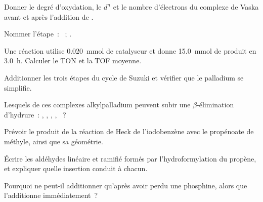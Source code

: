 \begin{exercise}[$\star$]\label{exo:b2:catalytic-cycles:1}
Donner le degré d'oxydation, le $d^n$ et le nombre d'électrons du complexe de Vaska
 avant et après l'addition de .
\end{exercise}

\begin{exercise}[$\star$]\label{exo:b2:catalytic-cycles:2}
Nommer l'étape~: ~; .
\end{exercise}

\begin{exercise}[$\star$]\label{exo:b2:catalytic-cycles:3}
Une réaction utilise \qty{0.020}{mmol} de catalyseur et donne \qty{15.0}{mmol} de produit en
\qty{3.0}{h}. Calculer le TON et la TOF moyenne.
\end{exercise}

\begin{exercise}[$\star$]\label{exo:b2:catalytic-cycles:4}
Additionner les trois étapes du cycle de Suzuki et vérifier que le palladium se simplifie.
\end{exercise}

\begin{exercise}[$\star\star$]\label{exo:b2:catalytic-cycles:5}
Lesquels de ces complexes alkylpalladium peuvent subir une $\beta$-élimination d'hydrure~:
, , , , ~?
\end{exercise}

\begin{exercise}[$\star\star$]\label{exo:b2:catalytic-cycles:6}
Prévoir le produit de la réaction de Heck de l'iodobenzène avec le propénoate de méthyle, ainsi que sa
géométrie.
\end{exercise}

\begin{exercise}[$\star\star$]\label{exo:b2:catalytic-cycles:7}
Écrire les aldéhydes linéaire et ramifié formés par l'hydroformylation du propène, et
expliquer quelle insertion conduit à chacun.
\end{exercise}

\begin{exercise}[$\star\star$]\label{exo:b2:catalytic-cycles:8}
Pourquoi  ne peut-il additionner  qu'après avoir perdu une phosphine, alors que
 l'additionne immédiatement~?
\end{exercise}


